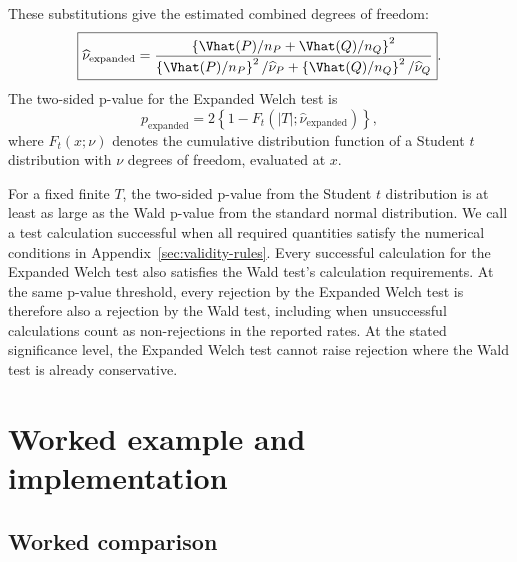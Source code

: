 These substitutions give the estimated combined degrees of freedom:
\begin{equation}
  \boxed{
  \widehat\nu_{\mathrm{expanded}}
  =
  \frac{
  \left\{\Vhat(P)/n_P+\Vhat(Q)/n_Q\right\}^2
  }{
  \left\{\Vhat(P)/n_P\right\}^2/\widehat\nu_P
  +
  \left\{\Vhat(Q)/n_Q\right\}^2/\widehat\nu_Q
  }
  }.
  \label{eq:expanded-df}
\end{equation}
The two-sided p-value for the Expanded Welch test is
\begin{equation}
  p_{\mathrm{expanded}}
  =2\left\{1-F_t(|T|;\widehat\nu_{\mathrm{expanded}})\right\},
  \label{eq:expanded-p}
\end{equation}
where \(F_t(x;\nu)\) denotes the cumulative distribution function of a
Student \(t\) distribution with \(\nu\) degrees of freedom, evaluated at \(x\).

For a fixed finite \(T\), the two-sided p-value from the Student \(t\)
distribution is at least as large as the Wald p-value from the standard
normal distribution.
We call a test calculation successful when all required quantities satisfy
the numerical conditions in Appendix~\ref{sec:validity-rules}. Every
successful calculation for the Expanded Welch test also satisfies the Wald test's
calculation requirements. At the same p-value threshold, every rejection by the
Expanded Welch test is therefore also a rejection by the Wald test, including when unsuccessful calculations
count as non-rejections in the reported rates. At the stated significance
level, the Expanded Welch test cannot raise rejection where the Wald test is already
conservative.

\section{Worked example and implementation}

\subsection{Worked comparison}

